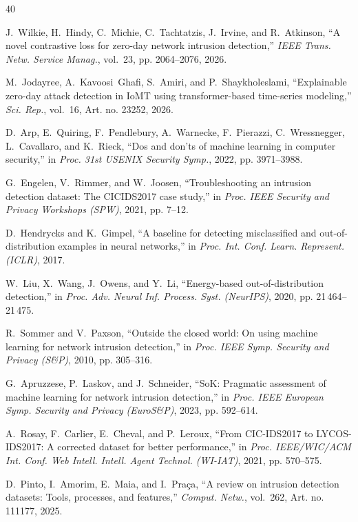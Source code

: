 \begin{thebibliography}{40}

J.~Wilkie, H.~Hindy, C.~Michie, C.~Tachtatzis, J.~Irvine, and R.~Atkinson, ``A novel contrastive loss for zero-day network intrusion detection,'' \emph{IEEE Trans. Netw. Service Manag.}, vol.~23, pp. 2064--2076, 2026.

M.~Jodayree, A.~Kavoosi~Ghafi, S.~Amiri, and P.~Shaykholeslami, ``Explainable zero-day attack detection in IoMT using transformer-based time-series modeling,'' \emph{Sci. Rep.}, vol.~16, Art. no. 23252, 2026.

D.~Arp, E.~Quiring, F.~Pendlebury, A.~Warnecke, F.~Pierazzi, C.~Wressnegger, L.~Cavallaro, and K.~Rieck, ``Dos and don'ts of machine learning in computer security,'' in \emph{Proc. 31st USENIX Security Symp.}, 2022, pp. 3971--3988.

G.~Engelen, V.~Rimmer, and W.~Joosen, ``Troubleshooting an intrusion detection dataset: The CICIDS2017 case study,'' in \emph{Proc. IEEE Security and Privacy Workshops (SPW)}, 2021, pp. 7--12.

D.~Hendrycks and K.~Gimpel, ``A baseline for detecting misclassified and out-of-distribution examples in neural networks,'' in \emph{Proc. Int. Conf. Learn. Represent. (ICLR)}, 2017.

W.~Liu, X.~Wang, J.~Owens, and Y.~Li, ``Energy-based out-of-distribution detection,'' in \emph{Proc. Adv. Neural Inf. Process. Syst. (NeurIPS)}, 2020, pp. 21\,464--21\,475.

R.~Sommer and V.~Paxson, ``Outside the closed world: On using machine learning for network intrusion detection,'' in \emph{Proc. IEEE Symp. Security and Privacy (S\&P)}, 2010, pp. 305--316.

G.~Apruzzese, P.~Laskov, and J.~Schneider, ``SoK: Pragmatic assessment of machine learning for network intrusion detection,'' in \emph{Proc. IEEE European Symp. Security and Privacy (EuroS\&P)}, 2023, pp. 592--614.

A.~Rosay, F.~Carlier, E.~Cheval, and P.~Leroux, ``From CIC-IDS2017 to LYCOS-IDS2017: A corrected dataset for better performance,'' in \emph{Proc. IEEE/WIC/ACM Int. Conf. Web Intell. Intell. Agent Technol. (WI-IAT)}, 2021, pp. 570--575.

D.~Pinto, I.~Amorim, E.~Maia, and I.~Pra\c{c}a, ``A review on intrusion detection datasets: Tools, processes, and features,'' \emph{Comput. Netw.}, vol.~262, Art. no. 111177, 2025.


\end{thebibliography}

